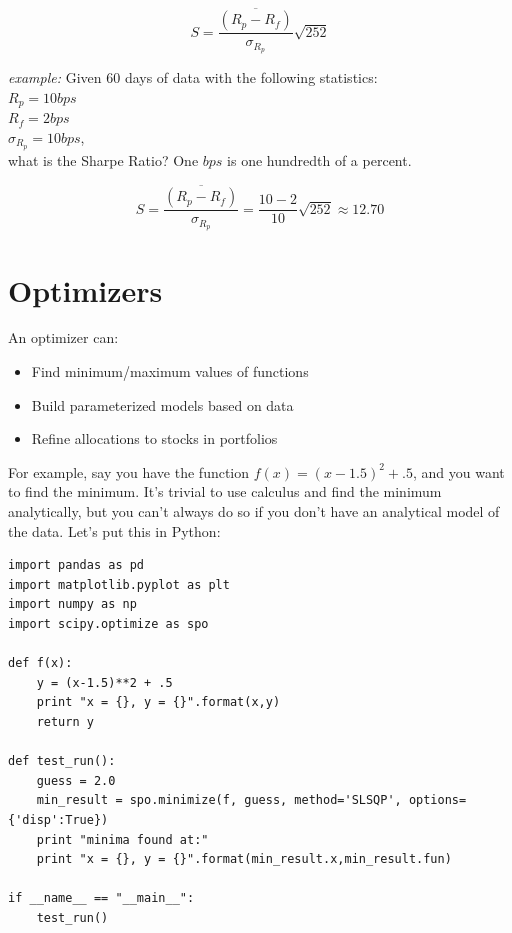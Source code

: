 \begin{equation*}
	S = \frac{\overline{(R_p - R_f)}}{\sigma_{R_p}}\sqrt{252}
\end{equation*}

\noindent\textit{example:} Given 60 days of data with the following statistics:\\
\noindent$R_p = 10 bps$\\
$R_f = 2 bps$\\
$\sigma_{R_p} = 10 bps$,\\
what is the Sharpe Ratio? One $bps$ is one hundredth of a percent.

\begin{equation*}
	S = \frac{\overline{(R_p - R_f)}}{\sigma_{R_p}} = \frac{10-2}{10}\sqrt{252} 
    \approx 12.70
\end{equation*}

\section{Optimizers}
\noindent An optimizer can:
\begin{itemize}
  \item Find minimum/maximum values of functions
  \item Build parameterized models based on data
  \item Refine allocations to stocks in portfolios
\end{itemize}

\noindent For example, say you have the function $f(x) = (x-1.5)^2 + .5$, and you want to find the minimum. It's trivial to use calculus and find the minimum analytically, but you can't always do so if you don't have an analytical model of the data. Let's put this in Python:

\noindent\begin{minipage}{\linewidth}
\begin{lstlisting}[style=python]
import pandas as pd
import matplotlib.pyplot as plt
import numpy as np
import scipy.optimize as spo

def f(x):
	y = (x-1.5)**2 + .5
	print "x = {}, y = {}".format(x,y)
	return y
    
def test_run():
 	guess = 2.0
	min_result = spo.minimize(f, guess, method='SLSQP', options={'disp':True})
	print "minima found at:"
	print "x = {}, y = {}".format(min_result.x,min_result.fun)
    
if __name__ == "__main__":
	test_run()
\end{lstlisting}
\end{minipage}

